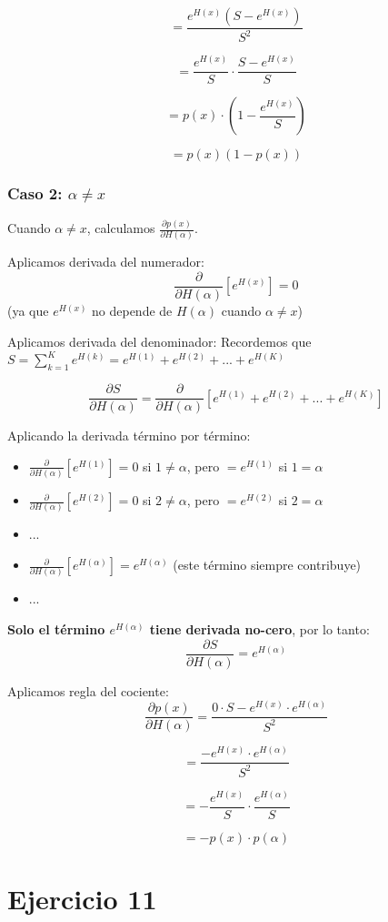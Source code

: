 \documentclass[12pt,a4paper]{article}
\begin{document}
$$= \frac{e^{H(x)}(S - e^{H(x)})}{S^2}$$

$$= \frac{e^{H(x)}}{S} \cdot \frac{S - e^{H(x)}}{S}$$

$$= p(x) \cdot \left(1 - \frac{e^{H(x)}}{S}\right)$$

$$= p(x)(1 - p(x))$$

\subsubsection{Caso 2: $\alpha \neq x$}

Cuando $\alpha \neq x$, calculamos $\frac{\partial p(x)}{\partial H(\alpha)}$.

Aplicamos derivada del numerador:
$$\frac{\partial}{\partial H(\alpha)}[e^{H(x)}] = 0$$
(ya que $e^{H(x)}$ no depende de $H(\alpha)$ cuando $\alpha \neq x$)

Aplicamos derivada del denominador:
Recordemos que $S = \sum_{k=1}^{K} e^{H(k)} = e^{H(1)} + e^{H(2)} + ... + e^{H(K)}$

$$\frac{\partial S}{\partial H(\alpha)} = \frac{\partial}{\partial H(\alpha)}\left[e^{H(1)} + e^{H(2)} + ... + e^{H(K)}\right]$$

Aplicando la derivada término por término:
\begin{itemize}
    \item $\frac{\partial}{\partial H(\alpha)}[e^{H(1)}] = 0$ si $1 \neq \alpha$, pero $= e^{H(1)}$ si $1 = \alpha$
    \item $\frac{\partial}{\partial H(\alpha)}[e^{H(2)}] = 0$ si $2 \neq \alpha$, pero $= e^{H(2)}$ si $2 = \alpha$
    \item ...
    \item $\frac{\partial}{\partial H(\alpha)}[e^{H(\alpha)}] = e^{H(\alpha)}$ (este término siempre contribuye)
    \item ...
\end{itemize}

\textbf{Solo el término $e^{H(\alpha)}$ tiene derivada no-cero}, por lo tanto:
$$\frac{\partial S}{\partial H(\alpha)} = e^{H(\alpha)}$$

Aplicamos regla del cociente:
$$\frac{\partial p(x)}{\partial H(\alpha)} = \frac{0 \cdot S - e^{H(x)} \cdot e^{H(\alpha)}}{S^2}$$

$$= \frac{-e^{H(x)} \cdot e^{H(\alpha)}}{S^2}$$

$$= -\frac{e^{H(x)}}{S} \cdot \frac{e^{H(\alpha)}}{S}$$

$$= -p(x) \cdot p(\alpha)$$

\section{Ejercicio 11} %
\end{document}
